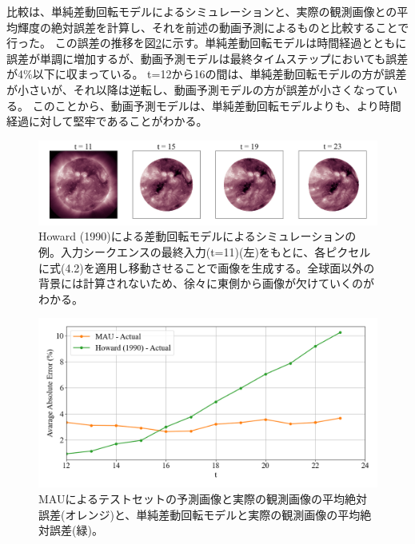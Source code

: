           比較は、単純差動回転モデルによるシミュレーションと、実際の観測画像との平均輝度の絶対誤差を計算し、それを前述の動画予測によるものと比較することで行った。
          この誤差の推移を図\ref{fig:exp1_error_sdr}に示す。単純差動回転モデルは時間経過とともに誤差が単調に増加するが、動画予測モデルは最終タイムステップにおいても誤差が4\%以下に収まっている。
          t=12から16の間は、単純差動回転モデルの方が誤差が小さいが、それ以降は逆転し、動画予測モデルの方が誤差が小さくなっている。
          このことから、動画予測モデルは、単純差動回転モデルよりも、より時間経過に対して堅牢であることがわかる。
          \begin{figure}[htbp]
            \centering
            \includegraphics[width=1.1\textwidth]{figures/exp1/sdr.png}
            \caption{Howard (1990)による差動回転モデルによるシミュレーションの例。入力シークエンスの最終入力(t=11)(左)をもとに、各ピクセルに式(4.2)を適用し移動させることで画像を生成する。全球面以外の背景には計算されないため、徐々に東側から画像が欠けていくのがわかる。}
            \label{fig:exp1_sdr_example}
          \end{figure}

          \begin{figure}[htbp]
            \centering
            \includegraphics[width=\textwidth]{figures/exp1/error_dr.png}
            \caption{MAUによるテストセットの予測画像と実際の観測画像の平均絶対誤差(オレンジ)と、単純差動回転モデルと実際の観測画像の平均絶対誤差(緑)。}
            \label{fig:exp1_error_sdr}
          \end{figure}
          
